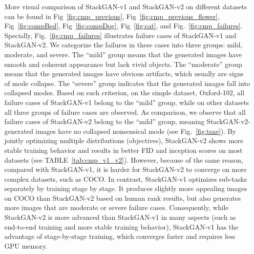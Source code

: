 \documentclass[10pt,journal,letterpaper,compsoc]{IEEEtran}
\begin{document}
{More visual comparison of StackGAN-v1 and StackGAN-v2 on different datasets can be found in Fig~\ref{fig:cmp_previous}, Fig~\ref{fig:cmp_previous_flower}, Fig~\ref{fig:compBed}, Fig~\ref{fig:compDog}, Fig~\ref{fig:cat}, and Fig.~\ref{fig:cmp_failures}. Specially, Fig.~\ref{fig:cmp_failures} illustrates failure cases of StackGAN-v1 and StackGAN-v2. We categorize the failures in these cases into three groups: mild, moderate, and severe. The ``mild'' group means that the generated images have smooth and coherent appearance but lack vivid objects. The ``moderate'' group means that the generated images have obvious artifacts, which usually are signs of mode collapse. The ``severe'' group indicates that the generated images fall into collapsed modes.  Based on such criterion, on the simple dataset, Oxford-102, all failure cases of StackGAN-v1 belong to the ``mild'' group, while on other datasets all three groups of failure cases are observed. As comparison, we observe that all failure cases of StackGAN-v2 belong to the ``mild'' group, meaning StackGAN-v2-generated images have no collapsed nonsensical mode (see Fig.~\ref{fig:tsne}). By jointly optimizing multiple distributions (objectives), StackGAN-v2 shows more stable training behavior and results in better FID and inception scores on most datasets (see TABLE~\ref{tab:cmp_v1_v2}). However, because of the same reason, compared with StackGAN-v1, it is harder for StackGAN-v2 to converge on more complex datasets, such as COCO.  In contrast, StackGAN-v1 optimizes sub-tasks separately by training stage by stage. It produces slightly more appealing images on COCO than StackGAN-v2 based on human rank results, but also generates more images that are moderate or severe failure cases. Consequently, while StackGAN-v2 is more advanced than StackGAN-v1 in many aspects (such as end-to-end training and more stable training behavior), StackGAN-v1 has the advantage of stage-by-stage training, which converges faster and requires less GPU memory. 
}
\end{document}
